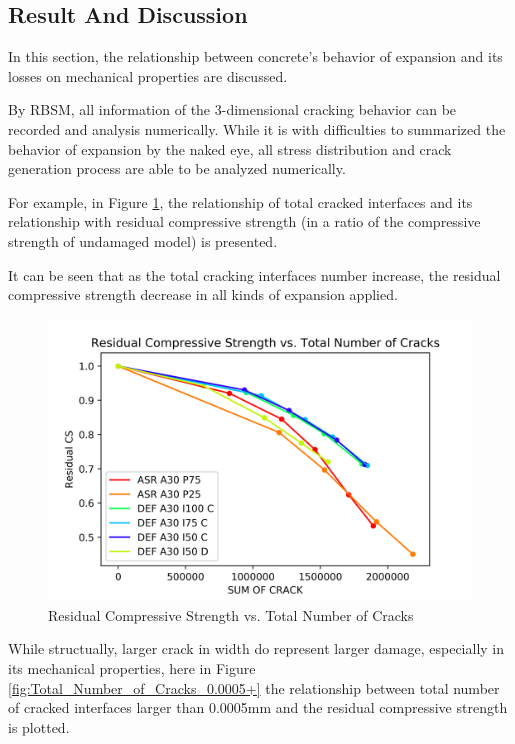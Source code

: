 \clearpage

\subsection{Result And Discussion}

In this section, the relationship between concrete's behavior of expansion and its losses on mechanical properties are discussed.

By RBSM, all information of the 3-dimensional cracking behavior can be recorded and analysis numerically. While it is with difficulties to summarized the behavior of expansion by the naked eye, all stress distribution and crack generation process are able to be analyzed numerically.

For example, in Figure \ref{fig:Total_Number_of_Cracks}, the relationship of total cracked interfaces and its relationship with residual compressive strength (in a ratio of the compressive strength of undamaged model) is presented.

It can be seen that as the total cracking interfaces number increase, the residual compressive strength decrease in all kinds of expansion applied.

\begin{figure}[ht]
\centering
\includegraphics[width=.8\linewidth]{Files/exp_3D/Residual_Compressive_Strength_vs_Total_Number_of_Cracks.png}
  \caption{Residual Compressive Strength vs. Total Number of Cracks}
  \label{fig:Total_Number_of_Cracks}
\end{figure}

While structually, larger crack in width do represent larger damage, especially in its mechanical properties, here in Figure \ref{fig:Total_Number_of_Cracks_0.0005+} the relationship between total number of cracked interfaces larger than 0.0005mm and the residual compressive strength is plotted.

